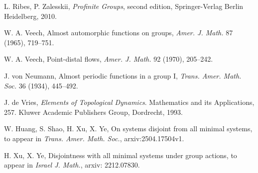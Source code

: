 \documentclass[11pt]{amsart}
\theoremstyle{definition}
\numberwithin{equation}{section}
\theoremstyle{definition}
\begin{document}
L. Ribes, P. Zalesskii,
\textit{Profinite Groups}, second edition, Springer-Verlag Berlin Heidelberg, 2010.

W. A. Veech,
Almost automorphic functions on groups,
\textit{Amer. J. Math.} 87 (1965), 719--751.

W. A. Veech,
Point-distal flows,
\textit{Amer. J. Math.} 92 (1970), 205--242.

 J. von Neumann, 
Almost periodic functions in a group I, \textit{Trans. Amer. Math. Soc.} 36 (1934),
445--492.

J. de Vries,
\textit{Elements of Topological Dynamics}.
Mathematics and its Applications, 257.
Kluwer Academic Publishers Group, Dordrecht, 1993.

W. Huang, S. Shao, H. Xu, X. Ye, 
On systems disjoint from all minimal systems, 
to appear in \textit{Trans. Amer. Math. Soc.}, arxiv:2504.17504v1.

H. Xu, X. Ye,
Disjointness with all minimal systems under group actions,
to appear in \textit{Israel J. Math.}, arxiv: 2212.07830.
\end{document}
